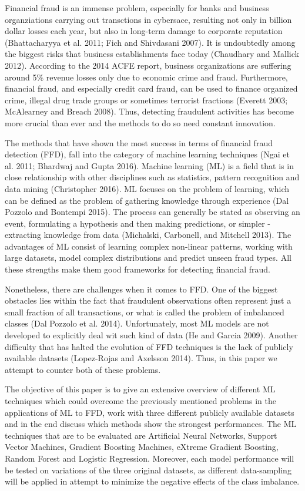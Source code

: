 \documentclass[12pt,]{article}
\begin{document}
Financial fraud is an immense problem, especially for banks and business
organziations carrying out transctions in cybersace, resulting not only
in billion dollar losses each year, but also in long-term damage to
corporate reputation (Bhattacharyya et al. 2011; Fich and Shivdasani
2007). It is undoubtedly among the biggest risks that business
establishments face today (Chaudhary and Mallick 2012). According to the
2014 ACFE report, business organizations are suffering around 5\%
revenue losses only due to economic crime and fraud. Furthermore,
financial fraud, and especially credit card fraud, can be used to
finance organized crime, illegal drug trade groups or sometimes
terrorist fractions (Everett 2003; McAlearney and Breach 2008). Thus,
detecting fraudulent activities has become more crucial than ever and
the methods to do so need constant innovation.

The methods that have shown the most success in terms of financial fraud
detection (FFD), fall into the category of machine learning techniques
(Ngai et al. 2011; Bhardwaj and Gupta 2016). Machine learning (ML) is a
field that is in close relationship with other disciplines such as
statistics, pattern recognition and data mining (Christopher 2016). ML
focuses on the problem of learning, which can be defined as the problem
of gathering knowledge through experience (Dal Pozzolo and Bontempi
2015). The process can generally be stated as observing an event,
formulating a hypothesis and then making predictions, or simpler -
extracting knowledge from data (Michalski, Carbonell, and Mitchell
2013). The advantages of ML consist of learning complex non-linear
patterns, working with large datasets, model complex distributions and
predict unseen fraud types. All these strengths make them good
frameworks for detecting financial fraud.

Nonetheless, there are challenges when it comes to FFD. One of the
biggest obstacles lies within the fact that fraudulent observations
often represent just a small fraction of all transactions, or what is
called the problem of imbalanced classes (Dal Pozzolo et al. 2014).
Unfortunately, most ML models are not developed to explicitly deal wit
such kind of data (He and Garcia 2009). Another difficulty that has
halted the evolution of FFD techniques is the lack of publicly available
datasets (Lopez-Rojas and Axelsson 2014). Thus, in this paper we attempt
to counter both of these problems.

The objective of this paper is to give an extensive overview of
different ML techniques which could overcome the previously mentioned
problems in the applications of ML to FFD, work with three different
publicly available datasets and in the end discuss which methods show
the strongest performances. The ML techniques that are to be evaluated
are Artificial Neural Networks, Support Vector Machines, Gradient
Boosting Machines, eXtreme Gradient Boosting, Random Forest and Logistic
Regression. Moreover, each model performance will be tested on
variations of the three original datasets, as different data-sampling
will be applied in attempt to minimize the negative effects of the class
imbalance.
\end{document}
